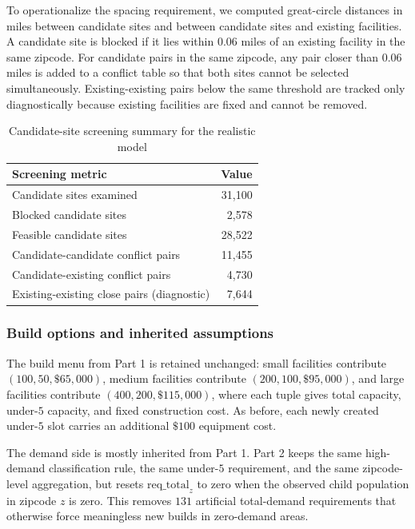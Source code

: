 \documentclass[11pt]{article}
\newcommand{\1}{\mathbb{I}}
\begin{document}
To operationalize the spacing requirement, we computed great-circle distances in miles between candidate sites and between candidate sites and existing facilities. A candidate site is blocked if it lies within \(0.06\) miles of an existing facility in the same zipcode. For candidate pairs in the same zipcode, any pair closer than \(0.06\) miles is added to a conflict table so that both sites cannot be selected simultaneously. Existing-existing pairs below the same threshold are tracked only diagnostically because existing facilities are fixed and cannot be removed.

\begin{table}[H]
\centering
\small
\begin{tabular}{lr}
\toprule
\textbf{Screening metric} & \textbf{Value} \\
\midrule
Candidate sites examined & 31,100 \\
Blocked candidate sites & 2,578 \\
Feasible candidate sites & 28,522 \\
Candidate-candidate conflict pairs & 11,455 \\
Candidate-existing conflict pairs & 4,730 \\
Existing-existing close pairs (diagnostic) & 7,644 \\
\bottomrule
\end{tabular}
\caption{Candidate-site screening summary for the realistic model}
\end{table}

\subsubsection{Build options and inherited assumptions}

The build menu from Part 1 is retained unchanged: small facilities contribute \((100, 50, \$65{,}000)\), medium facilities contribute \((200, 100, \$95{,}000)\), and large facilities contribute \((400, 200, \$115{,}000)\), where each tuple gives total capacity, under-\(5\) capacity, and fixed construction cost. As before, each newly created under-\(5\) slot carries an additional \(\$100\) equipment cost.

The demand side is mostly inherited from Part 1. Part 2 keeps the same high-demand classification rule, the same under-\(5\) requirement, and the same zipcode-level aggregation, but resets \(\mathrm{req\_total}_z\) to zero when the observed child population in zipcode \(z\) is zero. This removes \(131\) artificial total-demand requirements that otherwise force meaningless new builds in zero-demand areas.
\end{document}
